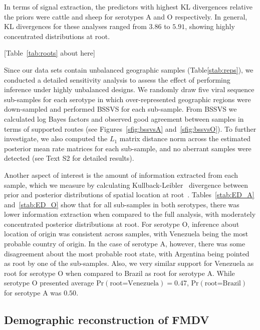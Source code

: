\documentclass[10pt]{article}
\begin{document}
In terms of signal extraction, the predictors with highest KL divergences relative the priors were cattle and sheep for serotypes A and O respectively.
In general, KL divergences for these analyses ranged from $3.86$ to $5.91$, showing highly concentrated distributions at root. 

\begin{center}
 [Table~\ref{tab:roots} about here]
\end{center}

Since our data sets contain unbalanced geographic samples (Table\ref{stab:reps}), we conducted a detailed sensitivity analysis to assess the effect of performing inference under highly unbalanced designs.
We randomly draw five viral sequence sub-samples for each serotype in which over-represented geographic regions were down-sampled and performed BSSVS for each sub-sample.
From BSSVS we calculated log Bayes factors and observed good agreement between samples in terms of supported routes (see Figures~\ref{sfig:bssvsA} and~\ref{sfig:bssvsO}).
To further investigate, we also computed the $L_1$ matrix distance norm across the estimated posterior mean rate matrices for each sub-sample, and no aberrant samples were detected (see Text S2 for detailed results).

Another aspect of interest is the amount of information extracted from each sample, which we measure by calculating Kullback-Leibler~\cite{KL} divergence between prior and posterior distributions of spatial location at root~\cite{roots}.
Tables~\ref{stab:ED_A} and~\ref{stab:ED_O} show that for all sub-samples in both serotypes, there was lower information extraction when compared to the full analysis, with moderately concentrated posterior distributions at root.
For serotype O, inference about location of origin was consistent across samples, with Venezuela being the most probable country of origin.
In the case of serotype A, however, there was some disagreement about the most probable root state, with Argentina being pointed as root by one of the sub-samples.
Also, we very similar support for Venezuela as root for serotype O when compared to Brazil as root for serotype A.
While serotype O presented average $\mbox{Pr}(\text{root=Venezuela})=0.47$, $\mbox{Pr}(\text{root=Brazil})$ for serotype A was $0.50$.

\subsection*{Demographic reconstruction of FMDV}
\end{document}
